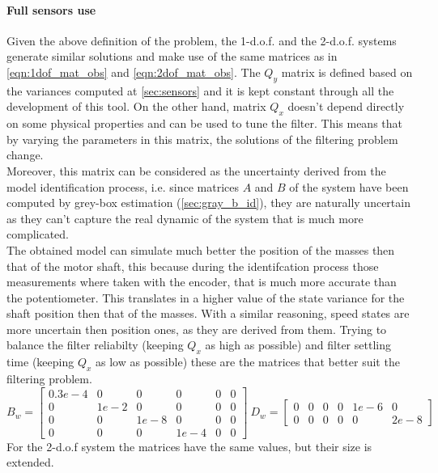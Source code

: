 \paragraph{Full sensors use}
Given the above definition of the problem, the 1-d.o.f. and the 2-d.o.f. systems generate similar solutions and make use of the same matrices as in \cref{eqn:1dof_mat_obs} and \cref{eqn:2dof_mat_obs}.
The $Q_y$ matrix is defined based on the variances computed at \cref{sec:sensors} and it is kept constant through all the development of this tool. 
On the other hand, matrix $Q_x$ doesn't depend directly on some physical properties and can be used to tune the filter. 
This means that by varying the parameters in this matrix, the solutions of the filtering problem change. \\
Moreover, this matrix can be considered as the uncertainty derived from the model identification process, i.e. since matrices $A$ and $B$ of the system have been computed by grey-box estimation (\cref{sec:gray_b_id}), they are naturally uncertain as they can't capture the real dynamic of the system that is much more complicated. \\
The obtained model can simulate much better the position of the masses then that of the motor shaft, this because during the identifcation process those measurements where taken with the encoder, that is much more accurate than the potentiometer. This translates in a higher value of the state variance for the shaft position then that of the masses. With a similar reasoning, speed states are more uncertain then position ones, as they are derived from them. Trying to balance the filter reliabilty (keeping $Q_x$ as high as possible) and filter settling time (keeping $Q_x$ as low as possible) these are the matrices that better suit the filtering problem.
\begin{equation}
	B_w = \begin{bmatrix}
		0.3e-4 & 0 & 0 & 0 & 0 & 0\\
		0 & 1e-2 & 0 & 0 & 0 & 0 \\
		0 & 0 & 1e-8 & 0 & 0 & 0  \\
		0 & 0 & 0 & 1e-4 & 0 & 0
	\end{bmatrix} \
	D_w = \begin{bmatrix}
		0 & 0 & 0 & 0 & 1e-6 & 0\\
		0 & 0 & 0 & 0 & 0 & 2e-8 
	\end{bmatrix} 
	\label{eqn:b_w_d_w}
\end{equation}
For the 2-d.o.f system the matrices have the same values, but their size is extended.\\
